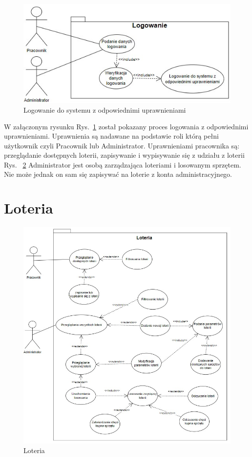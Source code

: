 \begin{figure}[h]
    \includegraphics{rys01/logowanie.jpg}
    \caption{Logowanie do systemu z odpowiednimi uprawnieniami}
    \label{logowanie_etykieta}
\end{figure}

W załączonym rysunku Rys.~\ref{logowanie_etykieta} został pokazany proces logowania z odpowiednimi uprawnieniami. Uprawnienia są nadawane na podstawie roli którą pełni użytkownik czyli Pracownik lub Administrator. Uprawnieniami pracownika są: przeglądanie dostępnych loterii, zapisywanie i wypisywanie się z udziału z loterii Rys. ~\ref{loteria_etykieta} Administrator jest osobą zarządzająca loteriami i losowanym sprzętem. Nie może jednak on sam się zapisywać na loterie z konta administracyjnego.
\newpage
\section {Loteria}

\begin{figure}[h]
    \includegraphics[scale=0.8]{rys01/loteria.jpg}
    \caption{Loteria}
    \label{loteria_etykieta}
\end{figure}


